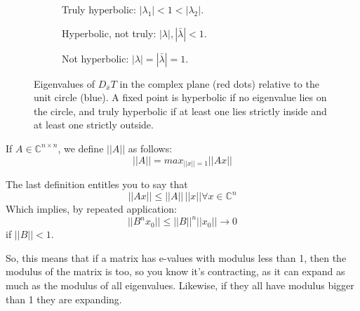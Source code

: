 \begin{figure}[ht]
    \centering
    \begin{subfigure}[t]{0.32\textwidth}
        \centering
        \caption{Truly hyperbolic: $|\lambda_1|<1<|\lambda_2|$.}
    \end{subfigure}\hfill
    \begin{subfigure}[t]{0.32\textwidth}
        \centering
        \caption{Hyperbolic, not truly: $|\lambda|,|\bar\lambda|<1$.}
    \end{subfigure}\hfill
    \begin{subfigure}[t]{0.32\textwidth}
        \centering
        \caption{Not hyperbolic: $|\lambda|=|\bar\lambda|=1$.}
    \end{subfigure}

    \caption{Eigenvalues of $D_{\bar{x}}T$ in the complex plane (red dots) relative to the unit
    circle (blue). A fixed point is hyperbolic if no eigenvalue lies on the circle, and truly
    hyperbolic if at least one lies strictly inside and at least one strictly outside.}
    \label{fig:hyperbolic_unit_circle}
\end{figure}

\begin{definition}
    If $A\in\mathbb{C}^{n\times n}$, we define $||A||$ as follows:\begin{equation*}
        ||A||=max_{||x||=1}||Ax||
    \end{equation*}
\end{definition}

\begin{observation}
    The last definition entitles you to say that \begin{equation*}
        ||Ax||\leq||A||\,||x|| \forall x\in\mathbb{C}^n
    \end{equation*}
    Which implies, by repeated application:
    \begin{equation*}
        ||B^nx_0||\leq ||B||^n||x_0||\rightarrow0 
    \end{equation*}
    if $||B||<1$.

    So, this means that if a matrix has e-values with modulus less than 1, then the modulus of the matrix is too, so you know it's contracting, as it can expand as much as the modulus of all eigenvalues. Likewise, if they all have modulus bigger than 1 they are expanding. 
\end{observation}

